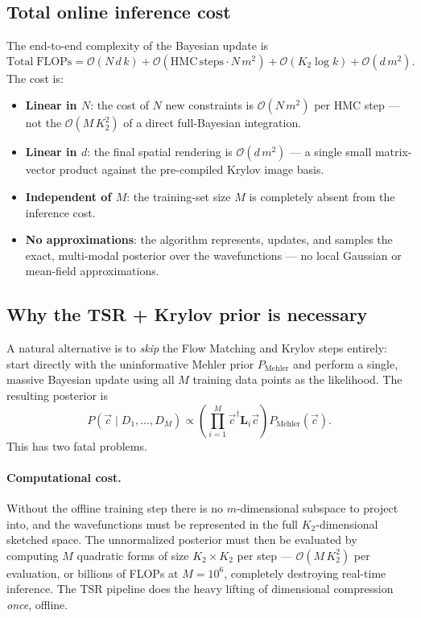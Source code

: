 \documentclass[11pt, a4paper]{article}
\begin{document}
\subsection{Total online inference cost}

The end-to-end complexity of the Bayesian update is
\begin{equation}
  \mathrm{Total\;FLOPs}=\mathcal{O}(N\,d\,k)+\mathcal{O}(\mathrm{HMC\,steps}
  \cdot N\,m^2)+\mathcal{O}(K_2\log k)+\mathcal{O}(d\,m^2).
  \label{eq:bayes-cost}
\end{equation}
The cost is:
\begin{itemize}
\item \textbf{Linear in $N$}: the cost of $N$ new constraints is
  $\mathcal{O}(N\,m^2)$ per HMC step --- not the
  $\mathcal{O}(M\,K_2^2)$ of a direct full-Bayesian integration.
\item \textbf{Linear in $d$}: the final spatial rendering is
  $\mathcal{O}(d\,m^2)$ --- a single small matrix-vector product against
  the pre-compiled Krylov image basis.
\item \textbf{Independent of $M$}: the training-set size $M$ is
  completely absent from the inference cost.
\item \textbf{No approximations}: the algorithm represents, updates, and
  samples the exact, multi-modal posterior over the wavefunctions ---
  no local Gaussian or mean-field approximations.
\end{itemize}

\subsection{Why the TSR + Krylov prior is necessary}

A natural alternative is to \emph{skip} the Flow Matching and Krylov
steps entirely: start directly with the uninformative Mehler prior
$P_{\mathrm{Mehler}}$ and perform a single, massive Bayesian update
using all $M$ training data points as the likelihood. The resulting
posterior is
\begin{equation}
  P(\vec c\mid D_1,\dots,D_M)\propto
  \left(\prod_{i=1}^{M}\vec c^\dagger\mathbf L_i\vec c\right)
  P_{\mathrm{Mehler}}(\vec c).
  \label{eq:direct}
\end{equation}
This has two fatal problems.

\paragraph{Computational cost.} Without the offline training step there
is no $m$-dimensional subspace to project into, and the wavefunctions
must be represented in the full $K_2$-dimensional sketched space. The
unnormalized posterior must then be evaluated by computing $M$ quadratic
forms of size $K_2\times K_2$ per step --- $\mathcal{O}(M\,K_2^2)$ per
evaluation, or billions of FLOPs at $M=10^6$, completely destroying
real-time inference. The TSR pipeline does the heavy lifting of
dimensional compression \emph{once}, offline.
\end{document}

